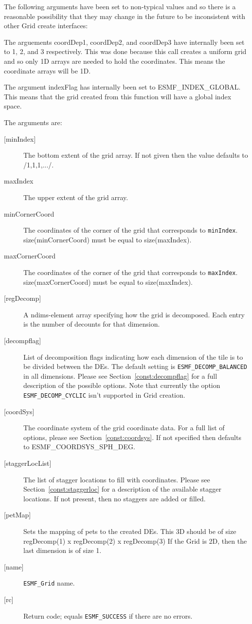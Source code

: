     The following arguments have been set to non-typical values and so
    there is a reasonable possibility that they may change in the future
    to be inconsistent with other Grid create interfaces:
  
    The arguements coordDep1, coordDep2, and coordDep3 have internally
    been set to 1, 2, and 3 respectively.
    This was done because this call creates a uniform grid and so only 1D arrays
    are needed to hold the coordinates. This means the coordinate arrays
    will be 1D.
  
    The argument indexFlag has internally been set to ESMF\_INDEX\_GLOBAL. This
    means that the grid created from this function will have a global index space.
  
   The arguments are:
   \begin{description}
   \item[{[minIndex]}]
        The bottom extent of the grid array. If not given then the value defaults
        to /1,1,1,.../.
   \item[maxIndex]
        The upper extent of the grid array.
   \item[minCornerCoord]
        The coordinates of the corner of the grid that corresponds to {\tt minIndex}.
        size(minCornerCoord) must be equal to size(maxIndex).
   \item[maxCornerCoord]
        The coordinates of the corner of the grid that corresponds to {\tt maxIndex}.
        size(maxCornerCoord) must be equal to size(maxIndex).
   \item[{[regDecomp]}]
        A ndims-element array specifying how the grid is decomposed.
        Each entry is the number of decounts for that dimension.
   \item[{[decompflag]}]
        List of decomposition flags indicating how each dimension of the
        tile is to be divided between the DEs. The default setting
        is {\tt ESMF\_DECOMP\_BALANCED} in all dimensions. Please see
        Section~\ref{const:decompflag} for a full description of the
        possible options. Note that currently the option
        {\tt ESMF\_DECOMP\_CYCLIC} isn't supported in Grid creation.
   \item[{[coordSys]}]
       The coordinate system of the grid coordinate data.
       For a full list of options, please see Section~\ref{const:coordsys}.
       If not specified then defaults to ESMF\_COORDSYS\_SPH\_DEG.
   \item[{[staggerLocList]}]
       The list of stagger locations to fill with coordinates. Please see Section~\ref{const:staggerloc}
       for a description of the available stagger locations. If not present, then
       no staggers are added or filled.
   \item[{[petMap]}]
         Sets the mapping of pets to the created DEs. This 3D
         should be of size regDecomp(1) x regDecomp(2) x regDecomp(3)
         If the Grid is 2D, then the last dimension is of size 1.
   \item[{[name]}]
        {\tt ESMF\_Grid} name.
   \item[{[rc]}]
        Return code; equals {\tt ESMF\_SUCCESS} if there are no errors.
   \end{description}
   
